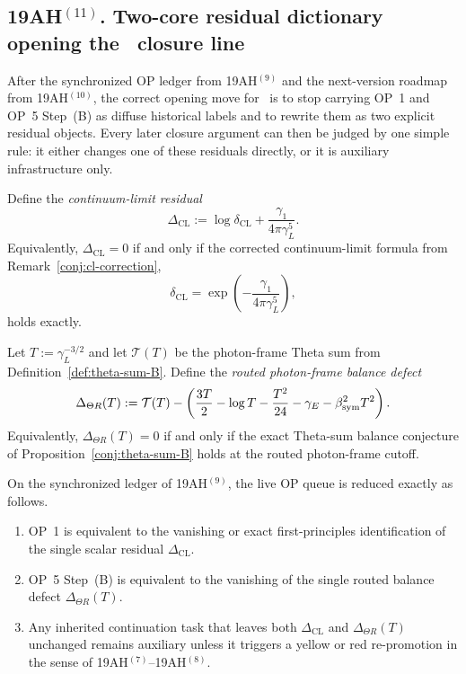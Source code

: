 \subsection*{19AH$^{(11)}$. Two-core residual dictionary opening the \docversion\ closure line}
After the synchronized OP ledger from 19AH$^{(9)}$ and the next-version roadmap from 19AH$^{(10)}$, the correct opening move for \docversion\ is to stop carrying OP~1 and OP~5 Step~(B) as diffuse historical labels and to rewrite them as two explicit residual objects. Every later closure argument can then be judged by one simple rule: it either changes one of these residuals directly, or it is auxiliary infrastructure only.

\begin{definition}
\label{def:delta-cl-residual}
Define the \emph{continuum-limit residual}
\[
 \Delta_{\mathrm{CL}}
 :=
 \log \delta_{\mathrm{CL}} + \frac{\gamma_1}{4\pi\gamma_L^5}.
\]
Equivalently, \(\Delta_{\mathrm{CL}}=0\) if and only if the corrected continuum-limit formula from Remark~\ref{conj:cl-correction},
\[
 \delta_{\mathrm{CL}} = \exp\!\left(-\frac{\gamma_1}{4\pi\gamma_L^5}\right),
\]
holds exactly.
\end{definition}

\begin{definition}
\label{def:delta-theta-r-residual}
Let \(T:=\gamma_L^{-3/2}\) and let \(\mathcal T(T)\) be the photon-frame Theta sum from Definition~\ref{def:theta-sum-B}. Define the \emph{routed photon-frame balance defect}
\[
 \Delta_{\Theta R}(T)
 :=
 \mathcal T(T)
 - \left(\frac{3T}{2} - \log T - \frac{T^2}{24} - \gamma_E - \beta_{\mathrm{sym}}^2 T^2\right).
\]
Equivalently, \(\Delta_{\Theta R}(T)=0\) if and only if the exact Theta-sum balance conjecture of Proposition~\ref{conj:theta-sum-B} holds at the routed photon-frame cutoff.
\end{definition}

\begin{proposition}
\label{prop:two-core-residual-dictionary}
On the synchronized ledger of 19AH$^{(9)}$, the live OP queue is reduced exactly as follows.
\begin{enumerate}[leftmargin=2em]
 \item OP~1 is equivalent to the vanishing or exact first-principles identification of the single scalar residual \(\Delta_{\mathrm{CL}}\).
 \item OP~5 Step~(B) is equivalent to the vanishing of the single routed balance defect \(\Delta_{\Theta R}(T)\).
 \item Any inherited continuation task that leaves both \(\Delta_{\mathrm{CL}}\) and \(\Delta_{\Theta R}(T)\) unchanged remains auxiliary unless it triggers a yellow or red re-promotion in the sense of 19AH$^{(7)}$--19AH$^{(8)}$.
\end{enumerate}
\end{proposition}

